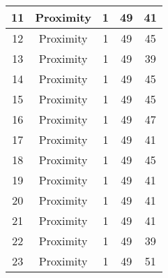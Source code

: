 \documentclass[results.tex]{subfiles}
\begin{document}
\begin{center}
\begin{tabular}{| c || c | c | c | c |}
            \hline
            11                      & Proximity                    & 1                      & 49                      & 41                   \\
            \hline
            12                      & Proximity                    & 1                      & 49                      & 45                   \\
            \hline
            13                      & Proximity                    & 1                      & 49                      & 39                   \\
            \hline
            14                      & Proximity                    & 1                      & 49                      & 45                   \\
            \hline
            15                      & Proximity                    & 1                      & 49                      & 45                   \\
            \hline
            16                      & Proximity                    & 1                      & 49                      & 47                   \\
            \hline
            17                      & Proximity                    & 1                      & 49                      & 41                   \\
            \hline
            18                      & Proximity                    & 1                      & 49                      & 45                   \\
            \hline
            19                      & Proximity                    & 1                      & 49                      & 41                   \\
            \hline
            20                      & Proximity                    & 1                      & 49                      & 41                   \\
            \hline
            21                      & Proximity                    & 1                      & 49                      & 41                   \\
            \hline
            22                      & Proximity                    & 1                      & 49                      & 39                   \\
            \hline
            23                      & Proximity                    & 1                      & 49                      & 51                   \\

\end{tabular}
\end{center}
\end{document}
